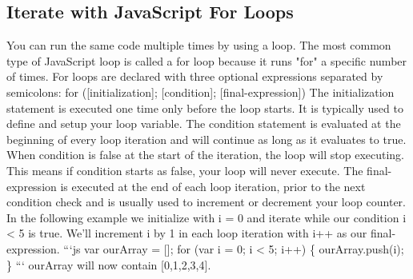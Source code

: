 \documentclass{article}%
\begin{document}
%
\subsection{Iterate with JavaScript For Loops}%
\label{subsec:IteratewithJavaScriptForLoops}%
You can run the same code multiple times by using a loop.\newline%
The most common type of JavaScript loop is called a for loop because it runs "for" a specific number of times.\newline%
For loops are declared with three optional expressions separated by semicolons:\newline%
for ({[}initialization{]}; {[}condition{]}; {[}final{-}expression{]})\newline%
The initialization statement is executed one time only before the loop starts. It is typically used to define and setup your loop variable.\newline%
The condition statement is evaluated at the beginning of every loop iteration and will continue as long as it evaluates to true. When condition is false at the start of the iteration, the loop will stop executing. This means if condition starts as false, your loop will never execute.\newline%
The final{-}expression is executed at the end of each loop iteration, prior to the next condition check and is usually used to increment or decrement your loop counter.\newline%
In the following example we initialize with i = 0 and iterate while our condition i < 5 is true. We'll increment i by 1 in each loop iteration with i++ as our final{-}expression.\newline%
```js\newline%
var ourArray = {[}{]};\newline%
for (var i = 0; i < 5; i++) \{\newline%
  ourArray.push(i);\newline%
\}\newline%
```\newline%
ourArray will now contain {[}0,1,2,3,4{]}.\newline%

%
\end{document}
